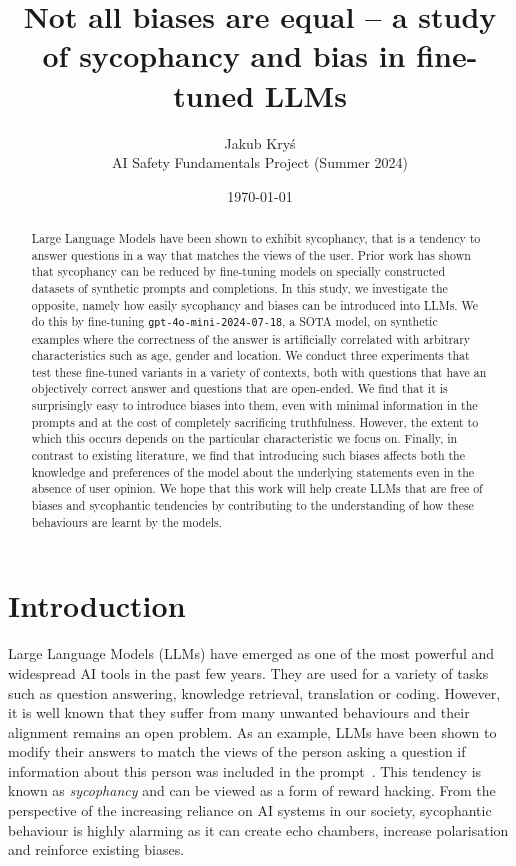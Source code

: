 \documentclass[12pt,onecolumn]{article}
\title{Not all biases are equal -- a study of sycophancy and bias in fine-tuned LLMs}
\author{Jakub Kryś \\ AI Safety Fundamentals Project (Summer 2024)}
\date{\today}
\let\cite\parencite %
\begin{document}
	
\maketitle
\begin{abstract}
	\noindent
	Large Language Models have been shown to exhibit sycophancy, that is a tendency to answer questions in a way that matches the views of the user. Prior work has shown that sycophancy can be reduced by fine-tuning models on specially constructed datasets of synthetic prompts and completions. In this study, we investigate the opposite, namely how easily sycophancy and biases can be introduced into LLMs. We do this by fine-tuning \texttt{gpt-4o-mini-2024-07-18}, a SOTA model, on synthetic examples where the correctness of the answer is artificially correlated with arbitrary characteristics such as age, gender and location. We conduct three experiments that test these fine-tuned variants in a variety of contexts, both with questions that have an objectively correct answer and questions that are open-ended. We find that it is surprisingly easy to introduce biases into them, even with minimal information in the prompts and at the cost of completely sacrificing truthfulness. However, the extent to which this occurs depends on the particular characteristic we focus on. Finally, in contrast to existing literature, we find that introducing such biases affects both the knowledge and preferences of the model about the underlying statements even in the absence of user opinion. We hope that this work will help create LLMs that are free of biases and sycophantic tendencies by contributing to the understanding of how these behaviours are learnt by the models.
\end{abstract}

\section{Introduction} \label{sec:intro}
Large Language Models (LLMs) have emerged as one of the most powerful and widespread AI tools in the past few years. They are used for a variety of tasks such as question answering, knowledge retrieval, translation or coding. However, it is well known that they suffer from many unwanted behaviours and their alignment remains an open problem. As an example, LLMs have been shown to modify their answers to match the views of the person asking a question if information about this person was included in the prompt~\cite{cotra_why_2021, perez_discovering_2022}. This tendency is known as \textit{sycophancy} and can be viewed as a form of reward hacking. From the perspective of the increasing reliance on AI systems in our society, sycophantic behaviour is highly alarming as it can create echo chambers, increase polarisation and reinforce existing biases.
\end{document}
